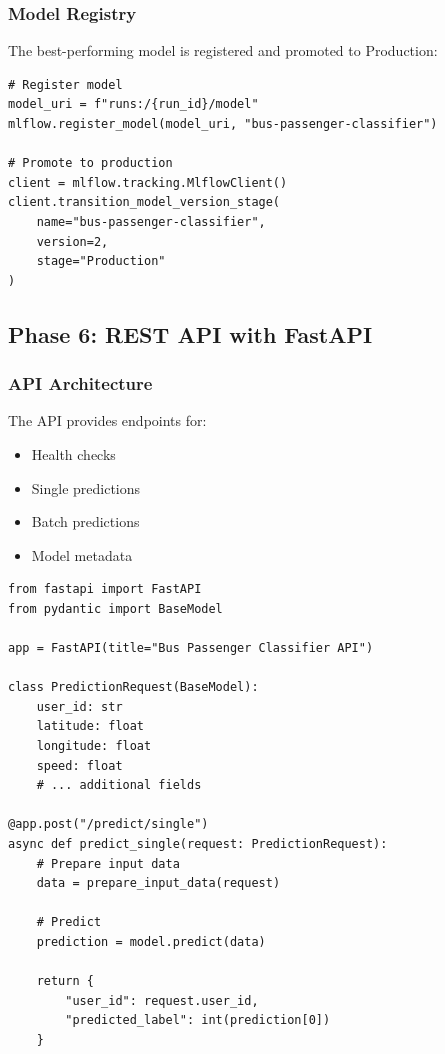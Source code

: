 \subsubsection{Model Registry}

The best-performing model is registered and promoted to Production:

\begin{lstlisting}[style=python, caption=Model Registration]
# Register model
model_uri = f"runs:/{run_id}/model"
mlflow.register_model(model_uri, "bus-passenger-classifier")

# Promote to production
client = mlflow.tracking.MlflowClient()
client.transition_model_version_stage(
    name="bus-passenger-classifier",
    version=2,
    stage="Production"
)
\end{lstlisting}

\subsection{Phase 6: REST API with FastAPI}

\subsubsection{API Architecture}

The API provides endpoints for:
\begin{itemize}
    \item Health checks
    \item Single predictions
    \item Batch predictions
    \item Model metadata
\end{itemize}

\begin{lstlisting}[style=python, caption=FastAPI Endpoints]
from fastapi import FastAPI
from pydantic import BaseModel

app = FastAPI(title="Bus Passenger Classifier API")

class PredictionRequest(BaseModel):
    user_id: str
    latitude: float
    longitude: float
    speed: float
    # ... additional fields

@app.post("/predict/single")
async def predict_single(request: PredictionRequest):
    # Prepare input data
    data = prepare_input_data(request)
    
    # Predict
    prediction = model.predict(data)
    
    return {
        "user_id": request.user_id,
        "predicted_label": int(prediction[0])
    }
\end{lstlisting}

